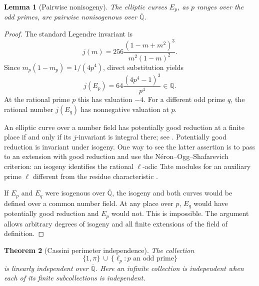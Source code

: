 \documentclass[11pt,a4paper]{article}
\newtheorem{theorem}{Theorem}[section]
\newtheorem{lemma}[theorem]{Lemma}
\theoremstyle{definition}
\theoremstyle{remark}
\numberwithin{equation}{section}
\newcommand{\Qbar}{\overline{\mathbb Q}}
\begin{document}
\begin{lemma}[Pairwise nonisogeny]\label{lm-nonisogeny}
The elliptic curves $E_p$, as $p$ ranges over the odd primes, are pairwise
nonisogenous over $\Qbar$.
\end{lemma}

\begin{proof}
The standard Legendre invariant is
\[
 j(m)=256\frac{(1-m+m^2)^3}{m^2(1-m)^2}.
\]
Since $m_p(1-m_p)=1/(4p^4)$, direct substitution yields
\begin{equation}\label{lm-j-invariant}
 j(E_p)=64\frac{(4p^4-1)^3}{p^4}\in\mathbb Q.
\end{equation}
At the rational prime $p$ this has valuation $-4$.  For a different odd
prime $q$, the rational number $j(E_q)$ has nonnegative valuation at $p$.

An elliptic curve over a number field has potentially good reduction at
a finite place if and only if its $j$-invariant is integral there; see
\cite[Chapter~VII, Proposition~5.5]{lm-Silverman}.  Potentially good
reduction is invariant under isogeny.  One way to see the latter assertion
is to pass to an extension with good reduction and use the
N\'eron--Ogg--Shafarevich criterion: an isogeny identifies the rational
$\ell$-adic Tate modules for an auxiliary prime $\ell$ different from the
residue characteristic \cite{lm-SerreTate}.

If $E_p$ and $E_q$ were isogenous over $\Qbar$, the isogeny and both curves
would be defined over a common number field.  At any place over $p$,
$E_q$ would have potentially good reduction and $E_p$ would not.  This is
impossible.  The argument allows arbitrary degrees of isogeny and all
finite extensions of the field of definition.
\end{proof}

\begin{theorem}[Cassini perimeter independence]\label{lm-cassini-independence}
The collection
\begin{equation}\label{lm-independent-family}
 \{1,\pi\}\ \cup\ \{\ell_p:p\text{ an odd prime}\}
\end{equation}
is linearly independent over $\Qbar$.  Here an infinite collection is
independent when each of its finite subcollections is independent.
\end{theorem}
\end{document}
